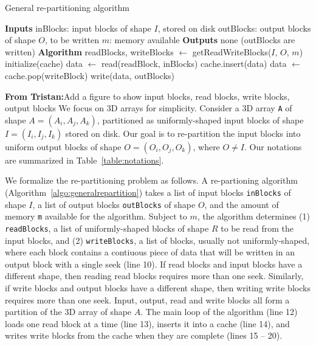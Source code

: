 \documentclass[sigconf, nonacm]{acmart}
\newcommand{\tristan}[1]{\color{orange}\textbf{From Tristan:}#1\color{black}}
\begin{document}
\begin{algorithm}
  \caption{General re-partitioning algorithm}
  \label{algo:generalrepartition}
  \begin{algorithmic}[1]
    \STATE \textbf{Inputs}
    \STATE inBlocks: input blocks of shape $I$, stored on disk
    \STATE outBlocks: output blocks of shape $O$, to be written
    \STATE $m$: memory available
    \STATE
    \STATE \textbf{Outputs}
    \STATE none (outBlocks are written)
    \STATE
    \STATE \textbf{Algorithm}
    \STATE readBlocks, writeBlocks $\leftarrow$ getReadWriteBlocks($I$, $O$, $m$)
    \STATE initialize(cache)
      \STATE data $\leftarrow$ read(readBlock, inBlocks)
      \STATE cache.insert(data)
          \STATE data $\leftarrow$ cache.pop(writeBlock)
          \STATE write(data, outBlocks)
        \ENDIF
      \ENDFOR
    \ENDFOR

  \end{algorithmic}
\end{algorithm}

\tristan{Add a figure to show input blocks, read blocks, write blocks, output blocks}
We focus on 3D arrays for simplicity. Consider a 3D array \texttt{A} of shape $A =
(A_i, A_j, A_k)$, partitioned as uniformly-shaped input blocks of shape $I =
(I_i, I_j, I_k)$ stored on disk. Our goal is to re-partition the input
blocks into uniform output blocks of shape $O = (O_i, O_j, O_k)$,
where $O \neq I$. Our notations are summarized in
Table~\ref{table:notations}.

We formalize the re-partitioning problem as follows.
A re-partioning algorithm (Algorithm~\ref{algo:generalrepartition}) takes a
list of input blocks \texttt{inBlocks} of shape $I$, a list of output
blocks \texttt{outBlocks} of shape $O$, and the amount of memory \texttt{m}
available for the algorithm. Subject to $m$, the algorithm determines (1)
\texttt{readBlocks}, a list of uniformly-shaped blocks of shape $R$ to be read from the
input blocks, and (2) \texttt{writeBlocks}, a list of blocks,
usually not uniformly-shaped, where each block contains a contiuous piece of
data that will be written in an output block with a single seek (line 10).
If read blocks and input blocks have a different shape, then reading read blocks requires
more than one seek. Similarly, if write blocks and output blocks have a different shape,
then writing write blocks requires more than one seek. Input, output, read
and write blocks all form a partition of the 3D array of shape $A$. The
main loop of the algorithm (line 12) loads one read block at a time (line
13), inserts it into a cache (line 14), and writes write blocks from the
cache when they are complete (lines 15 -- 20).
\end{document}
